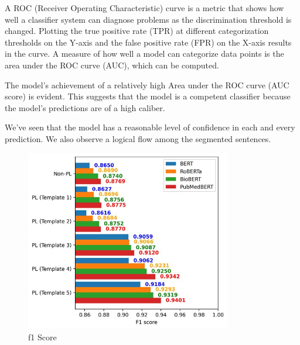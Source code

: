 \documentclass[conference]{IEEEtran}
\begin{document}
A ROC (Receiver Operating Characteristic) curve is a metric that shows how well a classifier system can diagnose problems as the discrimination threshold is changed. Plotting the true positive rate (TPR) at different categorization thresholds on the Y-axis and the false positive rate (FPR) on the X-axis results in the curve. A measure of how well a model can categorize data points is the area under the ROC curve (AUC), which can be computed.
\par
The model's achievement of a relatively high Area under the ROC curve (AUC score) is evident. This suggests that the model is a competent classifier because the model's predictions are of a high caliber.

We've seen that the model has a reasonable level of confidence in each and every prediction. We also observe a logical flow among the segmented sentences.

\begin{figure}
    \centering
    \includegraphics[width=9cm]{f1score.jpeg}
    \caption{f1 Score}
    \label{fig: sequence diagram}
\end{figure}





\newpage
\end{document}
